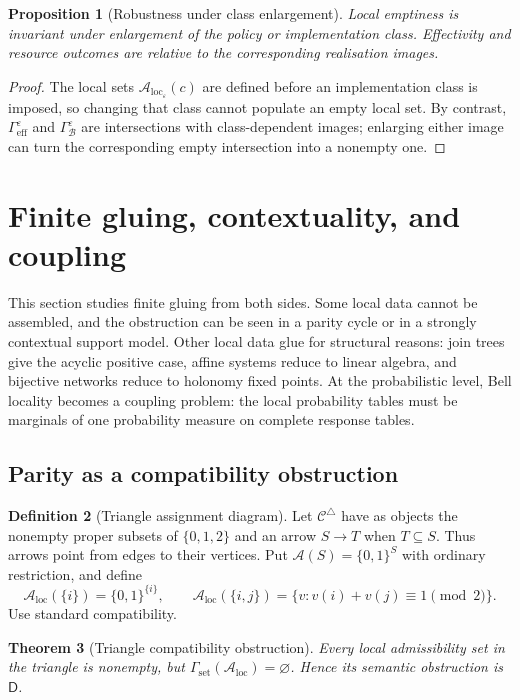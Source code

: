\documentclass[11pt]{article}
\theoremstyle{plain}
\newtheorem{theorem}{Theorem}[section]
\newtheorem{proposition}[theorem]{Proposition}
\theoremstyle{definition}
\newtheorem{definition}[theorem]{Definition}
\theoremstyle{remark}
\newcommand{\LocalAdm}{\mathcal{A}_{\mathrm{loc}}}
\newcommand{\eps}{\varepsilon}
\begin{document}
\begin{proposition}[Robustness under class enlargement]\label{prop:robust}
Local emptiness is invariant under enlargement of the policy or implementation
class. Effectivity and resource outcomes are relative to the corresponding
realisation images.
\end{proposition}

\begin{proof}
The local sets $\LocalAdm_\eps(c)$ are defined before an implementation class is
imposed, so changing that class cannot populate an empty local set. By contrast,
$\Gamma_{\mathrm{eff}}^\eps$ and $\Gamma_{\mathcal B}^\eps$ are intersections
with class-dependent images; enlarging either image can turn the corresponding
empty intersection into a nonempty one.
\end{proof}

\section{Finite gluing, contextuality, and coupling}\label{sec:Dtri}

This section studies finite gluing from both sides. Some local data cannot be
assembled, and the obstruction can be seen in a parity cycle or in a strongly
contextual support model. Other local data glue for structural reasons: join
trees give the acyclic positive case, affine systems reduce to linear algebra,
and bijective networks reduce to holonomy fixed points. At the probabilistic
level, Bell locality becomes a coupling problem: the local probability tables
must be marginals of one probability measure on complete response tables.

\subsection{Parity as a compatibility obstruction}

\begin{definition}[Triangle assignment diagram]\label{def:triangle}
Let $\mathcal C^\triangle$ have as objects the nonempty proper subsets of
$\{0,1,2\}$ and an arrow $S\to T$ when $T\subseteq S$. Thus arrows point from
edges to their vertices. Put $\mathcal A(S)=\{0,1\}^S$ with ordinary
restriction, and define
\[
\LocalAdm(\{i\})=\{0,1\}^{\{i\}},\qquad
\LocalAdm(\{i,j\})=
\{v:v(i)+v(j)\equiv1\pmod2\}.
\]
Use standard compatibility.
\end{definition}

\begin{theorem}[Triangle compatibility obstruction]\label{thm:Dtri}
Every local admissibility set in the triangle is nonempty, but
$\Gamma_{\mathrm{set}}(\LocalAdm)=\varnothing$. Hence its semantic obstruction
is $\mathsf D$.
\end{theorem}
\end{document}
